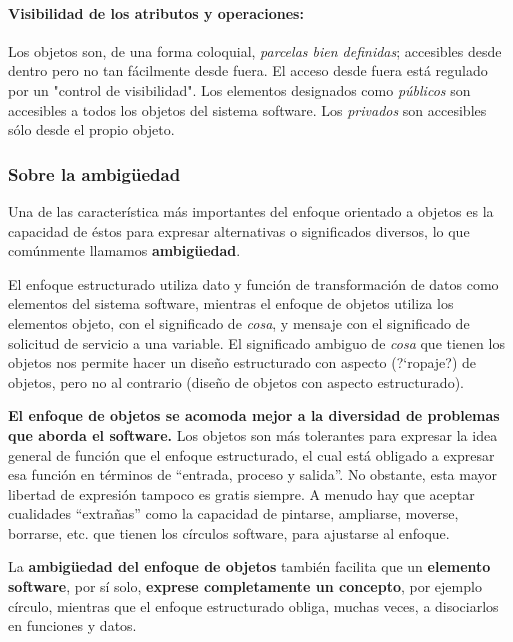 \vspace{5mm}

\paragraph{Visibilidad de los atributos y operaciones:} Los objetos
son, de una forma coloquial, \emph{parcelas bien definidas};
accesibles desde dentro pero no tan fácilmente desde fuera. El acceso
desde fuera está regulado por un "control de visibilidad".
Los elementos designados como \emph{públicos} son accesibles a todos
los objetos del sistema software. Los \emph{privados} son accesibles
sólo desde el propio objeto.

\subsubsection{Sobre la ambigüedad} Una de las característica más
importantes del enfoque orientado a objetos es la capacidad de éstos
para expresar alternativas o significados diversos, lo que comúnmente
llamamos \textbf{ambigüedad}.

\vspace{5mm}

El enfoque estructurado utiliza dato y función de transformación de
datos como elementos del sistema software, mientras el enfoque de
objetos utiliza los elementos objeto, con el significado de
\emph{cosa}, y mensaje con el significado de solicitud de servicio a
una variable.  El significado ambiguo de \emph{cosa} que tienen los
objetos nos permite hacer un diseño estructurado con aspecto (?`ropaje?)
de objetos, pero no al contrario (diseño de objetos con aspecto
estructurado).

\vspace{5mm}

\textbf{El enfoque de objetos se acomoda mejor a la diversidad de
  problemas que aborda el software.}  Los objetos son más tolerantes
para expresar la idea general de función que el enfoque estructurado,
el cual está obligado a expresar esa función en términos de “entrada,
proceso y salida”.  No obstante, esta mayor libertad de expresión
tampoco es gratis siempre. A menudo hay que aceptar cualidades
“extrañas” como la capacidad de pintarse, ampliarse, moverse,
borrarse, etc.  que tienen los círculos software, para ajustarse al
enfoque.

\vspace{5mm}

La \textbf{ambigüedad del enfoque de objetos} también facilita que un
\textbf{elemento software}, por sí solo, \textbf{exprese completamente
  un concepto}, por ejemplo círculo, mientras que el enfoque
estructurado obliga, muchas veces, a disociarlos en funciones y datos.


